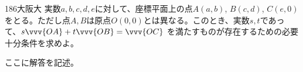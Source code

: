\begin{thm}{186}{}{大阪大}
 実数$a, b, c, d, e$に対して、座標平面上の点$A(a,b)$, $B(c,d)$, $C(e,0)$ をとる。ただし点$A, B$は原点$O(0,0)$とは異なる。このとき、実数$s, t$であって、$s\vvv{OA}+t\vvv{OB}=\vvv{OC}$ を満たすものが存在するための必要十分条件を求めよ。
\end{thm}

ここに解答を記述。